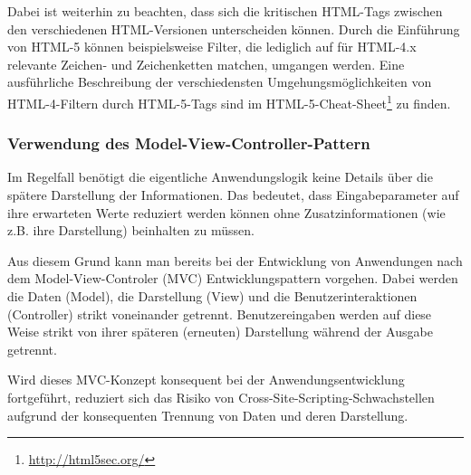 Dabei ist weiterhin zu beachten, dass sich die kritischen HTML-Tags 
zwischen den verschiedenen HTML-Versionen unterscheiden können. 
Durch die Einführung von HTML-5 können beispielsweise Filter, die 
lediglich auf für HTML-4.x relevante Zeichen- und Zeichenketten 
matchen, umgangen werden. Eine ausführliche Beschreibung der 
verschiedensten Umgehungsmöglichkeiten von HTML-4-Filtern durch 
HTML-5-Tags sind im HTML-5-Cheat-Sheet\footnote{\url{http://html5sec.org/}} 
zu finden.

\subsubsection{Verwendung des Model-View-Controller-Pattern}

Im Regelfall benötigt die eigentliche Anwendungslogik keine Details 
über die spätere Darstellung der Informationen. Das bedeutet, dass 
Eingabeparameter auf ihre erwarteten Werte reduziert werden können 
ohne Zusatzinformationen (wie z.B. ihre Darstellung) beinhalten 
zu müssen.

Aus diesem Grund kann man bereits bei der Entwicklung von Anwendungen 
nach dem Model-View-Controler (MVC) Entwicklungspattern vorgehen. Dabei 
werden die Daten (Model), die Darstellung (View) und die 
Benutzerinteraktionen (Controller) strikt voneinander getrennt. 
Benutzereingaben werden auf diese Weise strikt von ihrer späteren 
(erneuten) Darstellung während der Ausgabe getrennt.

Wird dieses MVC-Konzept konsequent bei der Anwendungsentwicklung 
fortgeführt, reduziert sich das Risiko von Cross-Site-Scripting-Schwachstellen 
aufgrund der konsequenten Trennung von Daten und deren Darstellung.


